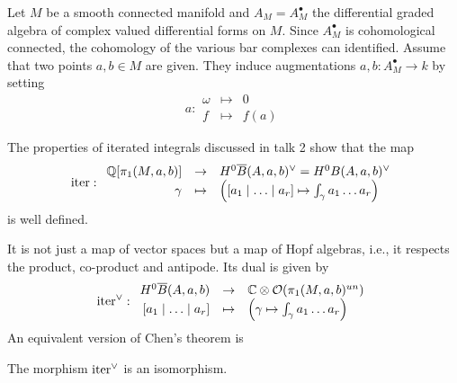 Let $M$ be a smooth connected manifold and $A_M = A^{\bullet}_M$ the differential graded algebra of complex valued differential forms on $M$. 
Since $A^\bullet_M$ is cohomological connected, the cohomology of the various bar complexes can identified. 
Assume that two points $a, b \in M$ are given. 
They induce augmentations $a,b : A_M^\bullet \to k$ by setting  
\[
a : 
\begin{array}{rcl} 
\omega & \mapsto & 0 \\
f  & \mapsto & f(a) 
\end{array}
\]

\begin{defn}\label{def:iter}
The properties of iterated integrals discussed in talk 2 show that the map 
\[
\mathrm{iter} : 
\begin{array}{rcl}
\mathbb{Q}[\pi_1(M, a, b)] & \to & H^0 \overline{B}(A, a, b)^{\vee} = H^0 B(A, a, b)^\vee \\
\gamma & \mapsto & \left( [a_1 \mid \ldots \mid a_r] \mapsto \int_{\gamma} a_1 \ldots a_r \right)
\end{array}
\]
is well defined. 
\end{defn}
It is not just a map of vector spaces but a map of Hopf algebras, i.e., it respects the product, co-product and antipode. Its dual is given by
\[
\mathrm{iter}^{\vee} : \begin{array}{rcl}
H^0 \overline{B}(A, a, b) & \to & \mathbb{C} \otimes \mathcal{O}( \pi_1(M, a, b)^{un}) \\
\textrm{$[a_1 \mid \ldots \mid a_r]$} & \mapsto & \left( \gamma \mapsto \int_{\gamma} a_1 \ldots a_r \right)
\end{array}
\]
An equivalent version of Chen's theorem is 
\begin{thm}[Chen]
The morphism $\mathrm{iter}^{\vee}$ is an isomorphism.
\end{thm}



